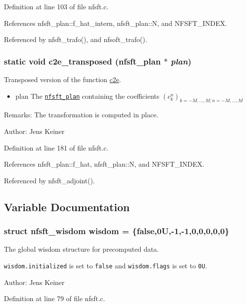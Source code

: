 Definition at line 103 of file nfsft.c.

References nfsft\_\-plan::f\_\-hat\_\-intern, nfsft\_\-plan::N, and NFSFT\_\-INDEX.

Referenced by nfsft\_\-trafo(), and nfsoft\_\-trafo().\hypertarget{group__nfsft_g0e033457136bc0ecb18bb57d3ee5aa37}{
\subsubsection{\setlength{\rightskip}{0pt plus 5cm}static void c2e\_\-transposed ({\bf nfsft\_\-plan} $\ast$ {\em plan})}}
\label{group__nfsft_g0e033457136bc0ecb18bb57d3ee5aa37}


Transposed version of the function \hyperlink{group__nfsft_g47209b28b6561fca7349ed8afa5f9656}{c2e}. 

\begin{itemize}
\item plan The {\tt \hyperlink{structnfsft__plan}{nfsft\_\-plan}} containing the coefficients $\left(c_k^n\right)_{k=-M,\ldots,M;n=-M,\ldots,M}$\end{itemize}
\begin{Desc}
\item[Remarks:]The transformation is computed in place.\end{Desc}
\begin{Desc}
\item[Author:]Jens Keiner \end{Desc}


Definition at line 181 of file nfsft.c.

References nfsft\_\-plan::f\_\-hat, nfsft\_\-plan::N, and NFSFT\_\-INDEX.

Referenced by nfsft\_\-adjoint().

\subsection{Variable Documentation}
\hypertarget{group__nfsft_g0af81d81e1b436949ddc46dbd27346e5}{
\subsubsection{\setlength{\rightskip}{0pt plus 5cm}struct {\bf nfsft\_\-wisdom} {\bf wisdom} = \{false,0U,-1,-1,0,0,0,0,0\}}}
\label{group__nfsft_g0af81d81e1b436949ddc46dbd27346e5}


The global wisdom structure for precomputed data. 

{\tt wisdom.initialized} is set to {\tt false} and {\tt wisdom.flags} is set to {\tt 0U}.

\begin{Desc}
\item[Author:]Jens Keiner \end{Desc}


Definition at line 79 of file nfsft.c.